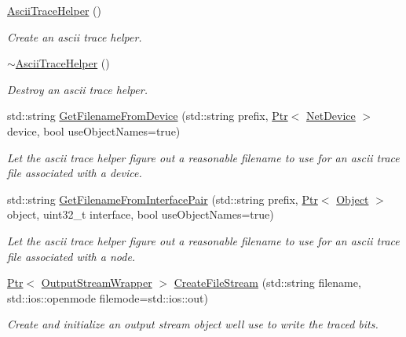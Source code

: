 \begin{DoxyCompactItemize}
\item 
\hyperlink{classns3_1_1AsciiTraceHelper_a957580f051c6ffdd0a837127a45929f1}{Ascii\+Trace\+Helper} ()
\begin{DoxyCompactList}\small\item\em Create an ascii trace helper. \end{DoxyCompactList}\item 
\hyperlink{classns3_1_1AsciiTraceHelper_ad6970e1272bb247bb66ba92735587fba}{$\sim$\+Ascii\+Trace\+Helper} ()
\begin{DoxyCompactList}\small\item\em Destroy an ascii trace helper. \end{DoxyCompactList}\item 
std\+::string \hyperlink{classns3_1_1AsciiTraceHelper_a0f3f35688a9712fb692f193ac4320cfd}{Get\+Filename\+From\+Device} (std\+::string prefix, \hyperlink{classns3_1_1Ptr}{Ptr}$<$ \hyperlink{classns3_1_1NetDevice}{Net\+Device} $>$ device, bool use\+Object\+Names=true)
\begin{DoxyCompactList}\small\item\em Let the ascii trace helper figure out a reasonable filename to use for an ascii trace file associated with a device. \end{DoxyCompactList}\item 
std\+::string \hyperlink{classns3_1_1AsciiTraceHelper_a2fc4a0bc9535ac07d285d606023d1b47}{Get\+Filename\+From\+Interface\+Pair} (std\+::string prefix, \hyperlink{classns3_1_1Ptr}{Ptr}$<$ \hyperlink{classns3_1_1Object}{Object} $>$ object, uint32\+\_\+t interface, bool use\+Object\+Names=true)
\begin{DoxyCompactList}\small\item\em Let the ascii trace helper figure out a reasonable filename to use for an ascii trace file associated with a node. \end{DoxyCompactList}\item 
\hyperlink{classns3_1_1Ptr}{Ptr}$<$ \hyperlink{classns3_1_1OutputStreamWrapper}{Output\+Stream\+Wrapper} $>$ \hyperlink{classns3_1_1AsciiTraceHelper_a44960bf2ca32835024eaedd26d1c4f94}{Create\+File\+Stream} (std\+::string filename, std\+::ios\+::openmode filemode=std\+::ios\+::out)
\begin{DoxyCompactList}\small\item\em Create and initialize an output stream object we\textquotesingle{}ll use to write the traced bits. \end{DoxyCompactList}\item 

\end{DoxyCompactItemize}
